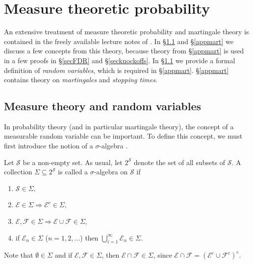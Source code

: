 \documentclass[11pt]{article}
\theoremstyle{plain}
\theoremstyle{definition}
\newcommand{\citt}{\citet}
\newcommand{\citp}{\citep}
\begin{document}
  
  

\setlength{\bibsep}{3pt plus 0.3ex}  %
\def\bibfont{\small}  %




























\newpage

\appendix
\section{Measure theoretic probability} 
An extensive treatment of measure theoretic probability  and martingale theory is contained in the freely available  lecture notes of \citt{spreij2023measure}. In \S\ref{apprv} and \S\ref{appmart} we discuss a few concepts from this theory, because theory from  \S\ref{appmart} is used in a few proofs in \S\ref{secFDR} and \S\ref{secknockoffs}.
In \S\ref{apprv} we provide a formal definition of \emph{random variables}, which is required in \S\ref{appmart}.
\S\ref{appmart} contains theory on \emph{martingales} and \emph{stopping times}.

\subsection{Measure theory and random variables} \label{apprv}
In probability theory (and in particular martingale theory), the concept of a measurable random variable can be important. To define this concept, we must first introduce the notion of a $\sigma$-algebra \citp{spreij2023measure}.

Let $\mathcal{S}$ be a non-empty set. As usual, let $2^\mathcal{S}$ denote the set of all subsets of $\mathcal{S}$. A collection $\Sigma\subseteq 2^{\mathcal{S}}$ is called a $\sigma$-algebra on $\mathcal{S}$ if
\begin{enumerate}
\item $\mathcal{S}\in \Sigma,$
\item $\mathcal{E}\in \Sigma \Rightarrow \mathcal{E}^c\in \Sigma,$
\item $\mathcal{E}, \mathcal{F}\in \Sigma  \Rightarrow \mathcal{E}\cup \mathcal{F}\in \Sigma$,
\item if $\mathcal{E}_n\in \Sigma$ ($n=1,2,...$) then $\bigcup_{i=1}^{\infty} \mathcal{E}_n \in \Sigma$.
\end{enumerate}
Note that $\emptyset\in \Sigma$ and if $\mathcal{E}, \mathcal{F}\in \Sigma$, then  $\mathcal{E} \cap \mathcal{F}\in \Sigma$, since $\mathcal{E} \cap \mathcal{F} =  (\mathcal{E}^c \cup \mathcal{F}^c)^c.$
\end{document}
